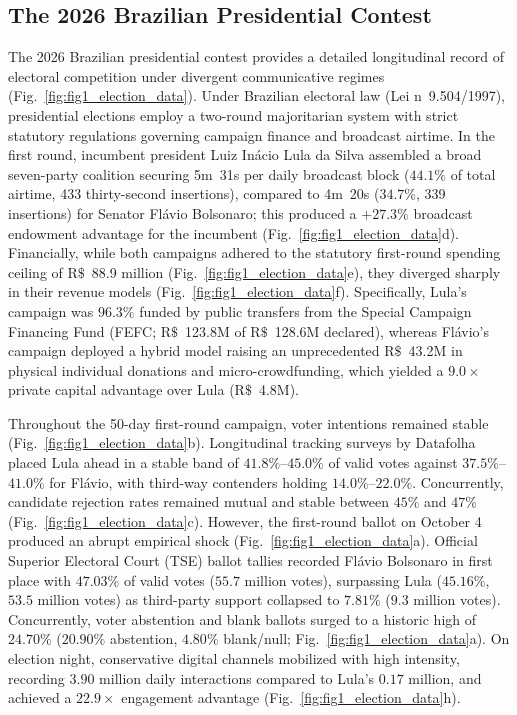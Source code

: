 \documentclass[a4paper,fleqn]{cas-dc}
\begin{document}
\subsection{The 2026 Brazilian Presidential Contest}
\label{subsec:brazil_2026}
The 2026 Brazilian presidential contest provides a detailed longitudinal record of electoral competition under divergent communicative regimes (Fig.~\ref{fig:fig1_election_data}). Under Brazilian electoral law (Lei n\textordmasculine~9.504/1997), presidential elections employ a two-round majoritarian system with strict statutory regulations governing campaign finance and broadcast airtime. In the first round, incumbent president Luiz Inácio Lula da Silva assembled a broad seven-party coalition securing 5m~31s per daily broadcast block ($44.1\%$ of total airtime, 433 thirty-second insertions), compared to 4m~20s ($34.7\%$, 339 insertions) for Senator Flávio Bolsonaro; this produced a $+27.3\%$ broadcast endowment advantage for the incumbent (Fig.~\ref{fig:fig1_election_data}d). Financially, while both campaigns adhered to the statutory first-round spending ceiling of $\mathrm{R}\$$~88.9 million (Fig.~\ref{fig:fig1_election_data}e), they diverged sharply in their revenue models (Fig.~\ref{fig:fig1_election_data}f). Specifically, Lula's campaign was $96.3\%$ funded by public transfers from the Special Campaign Financing Fund (FEFC; $\mathrm{R}\$$~123.8M of $\mathrm{R}\$$~128.6M declared), whereas Flávio's campaign deployed a hybrid model raising an unprecedented $\mathrm{R}\$$~43.2M in physical individual donations and micro-crowdfunding, which yielded a $9.0\times$ private capital advantage over Lula ($\mathrm{R}\$$~4.8M).

Throughout the 50-day first-round campaign, voter intentions remained stable (Fig.~\ref{fig:fig1_election_data}b). Longitudinal tracking surveys by Datafolha \citep{datafolha2026r1, datafolha2026r2} placed Lula ahead in a stable band of $41.8\%$--$45.0\%$ of valid votes against $37.5\%$--$41.0\%$ for Flávio, with third-way contenders holding $14.0\%$--$22.0\%$. Concurrently, candidate rejection rates remained mutual and stable between $45\%$ and $47\%$ (Fig.~\ref{fig:fig1_election_data}c). However, the first-round ballot on October 4 produced an abrupt empirical shock (Fig.~\ref{fig:fig1_election_data}a). Official Superior Electoral Court (TSE) ballot tallies \citep{tse2026resultados} recorded Flávio Bolsonaro in first place with $47.03\%$ of valid votes ($55.7$ million votes), surpassing Lula ($45.16\%$, $53.5$ million votes) as third-party support collapsed to $7.81\%$ ($9.3$ million votes). Concurrently, voter abstention and blank ballots surged to a historic high of $24.70\%$ ($20.90\%$ abstention, $4.80\%$ blank/null; Fig.~\ref{fig:fig1_election_data}a). On election night, conservative digital channels mobilized with high intensity, recording $3.90$ million daily interactions compared to Lula's $0.17$ million, and achieved a $22.9\times$ engagement advantage (Fig.~\ref{fig:fig1_election_data}h).
\end{document}
